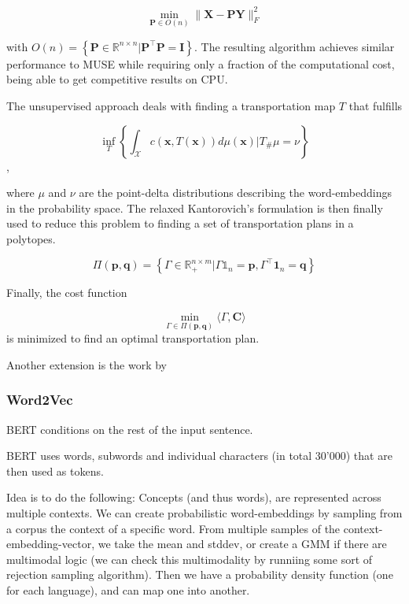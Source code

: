 \documentclass[a4paper,12pt,twoside,openright]{report}
\begin{document}
\begin{equation}
\min _{\mathbf{P} \in O(n)}\|\mathbf{X}-\mathbf{P} \mathbf{Y}\|_{F}^{2}
\end{equation}

with $O(n)=\left\{\mathbf{P} \in \mathbb{R}^{n \times n} | \mathbf{P}^{\top} \mathbf{P}=\mathbf{I}\right\}$.
The resulting algorithm achieves similar performance to MUSE while requiring only a fraction of the computational cost, being able to get competitive results on CPU.

The unsupervised approach deals with finding a transportation map $T$ that fulfills

\begin{equation}
\inf _{T}\left\{\int_{\mathcal{X}} c(\mathbf{x}, T(\mathbf{x})) d \mu(\mathbf{x}) | T_{\#} \mu=\nu\right\}
\end{equation},

where $\mu$ and $\nu$ are the point-delta distributions describing the word-embeddings in the probability space.
The relaxed Kantorovich's formulation is then finally used to reduce this problem to finding a set of transportation plans in a polytopes.

$$
\Pi(\mathbf{p}, \mathbf{q})=\left\{\Gamma \in \mathbb{R}_{+}^{n \times m} | \Gamma \mathbb{1}_{n}=\mathbf{p}, \Gamma^{\top} \mathbf{1}_{n}=\mathbf{q}\right\}
$$

Finally, the cost function

$$
\min _{\Gamma \in \Pi(\mathbf{p}, \mathbf{q})}\langle\Gamma, \mathbf{C}\rangle
$$
is minimized to find an optimal transportation plan.


Another extension is the work by  


\newpage
\subsubsection{Word2Vec}

BERT conditions on the rest of the input sentence.

BERT uses words, subwords and individual characters (in total 30'000) that are then used as tokens.

Idea is to do the following:
Concepts (and thus words), are represented across multiple contexts.
We can create probabilistic word-embeddings by sampling from a corpus the context of a specific word.
From multiple samples of the context-embedding-vector, we take the mean and stddev, or create a GMM if there are multimodal logic (we can check this multimodality by runniing some sort of rejection sampling algorithm).
Then we have a probability density function (one for each language), and can map one into another.
\end{document}
